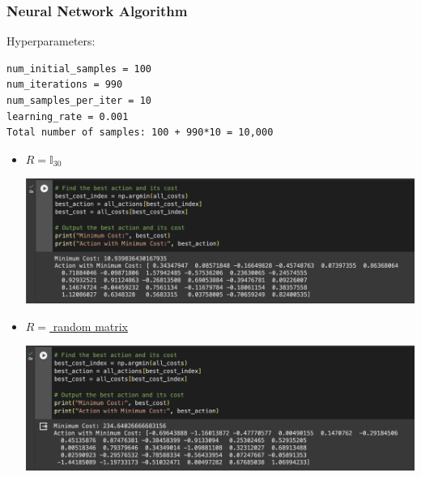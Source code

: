 \documentclass{article}
\begin{document}
\subsubsection*{Neural Network Algorithm}
Hyperparameters: 
\begin{verbatim}
num_initial_samples = 100
num_iterations = 990
num_samples_per_iter = 10
learning_rate = 0.001
Total number of samples: 100 + 990*10 = 10,000
\end{verbatim}
\begin{itemize}
    \item \underline{$R = \mathbb{I}_{30}$}\par
    \includegraphics[scale = 0.5]{NI.png}
    \item \underline{$R= $ random matrix}\par
    \includegraphics[scale=0.5]{NR.png}
\end{itemize}
\end{document}
